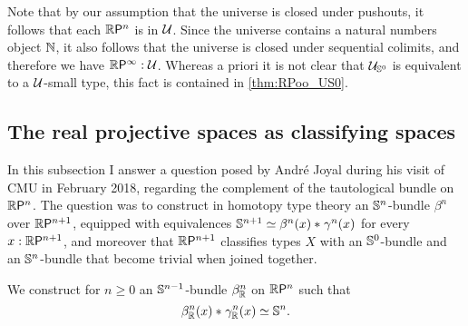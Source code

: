 \begin{rmk}
Note that by our assumption that the universe is closed under pushouts, it
follows that each $\rprojective{n}$ is in $\UU$. 
Since the universe contains a natural numbers object $\N$, 
it also follows that the universe is closed under sequential colimits,
and therefore we have $\rprojective{\infty}:\UU$. 
Whereas a priori it is not clear that $\UU_{\sphere{0}}$ is equivalent to a 
$\UU$-small type, this fact is contained in \autoref{thm:RPoo_US0}.
\end{rmk}

\subsection{The real projective spaces as classifying spaces}
In this subsection I answer a question posed by André Joyal during his visit of CMU in February 2018, regarding the complement of the tautological bundle on $\rprojective{n}$. The question was to construct in homotopy type theory an $\sphere{n}$-bundle $\beta^n$ over $\rprojective{n+1}$, equipped with equivalences $\eqv{\sphere{n+1}}{\join{\beta^n(x)}{\gamma^n(x)}}$ for every $x:\rprojective{n+1}$, and moreover that $\rprojective{n+1}$ classifies types $X$ with an $\sphere{0}$-bundle and an $\sphere{n}$-bundle that become trivial when joined together. 

\begin{defn}
We construct for $n\geq 0$ an $\sphere{n-1}$-bundle $\orthcomp[\R]{n}$ on $\rprojective{n}$ such that
\begin{equation*}
\eqv{\join{\orthcomp[\R]{n}(x)}{\tautfam[\R]{n}(x)}}{\sphere{n}}.
\end{equation*}
\end{defn}

